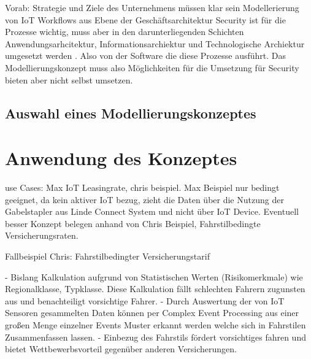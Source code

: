 \documentclass[a4paper, 12pt, twoside, headsepline=true]{scrartcl} %
\begin{document}
Vorab: Strategie und Ziele des Unternehmens müssen klar sein
Modellerierung von IoT Workflows aus Ebene der Geschäftsarchitektur
Security ist für die Prozesse wichtig, muss aber in den darunterliegenden Schichten Anwendungsarhcitektur, Informationsarchiektur und Technologische Archiektur umgesetzt werden \cite{enterpricearichitecture}. Also von der Software die diese Prozesse ausführt. Das Modellierungskonzept muss also Möglichkeiten für die Umsetzung für Security bieten aber nicht selbst umsetzen.


\subsection{Auswahl eines Modellierungskonzeptes}

\newpage

\section{Anwendung des Konzeptes}

use Cases: Max IoT Leasingrate, chris beispiel. Max Beispiel nur bedingt geeignet, da kein aktiver IoT bezug, zieht die Daten über die Nutzung der Gabelstapler aus Linde Connect System und nicht über IoT Device.
Eventuell besser Konzept belegen anhand von Chris Beispiel, Fahrstilbedingte Versicherungsraten. 

Fallbeispiel Chris: Fahrstilbedingter Versicherungstarif

- Bislang Kalkulation aufgrund von Statistischen Werten (Risikomerkmale) wie Regionalklasse, Typklasse. Diese Kalkulation fällt  schlechten Fahrern zugunsten aus und benachteiligt vorsichtige Fahrer.
- Durch Auswertung der von IoT Sensoren gesammelten Daten können per Complex Event Processing aus einer großen Menge einzelner Events Muster erkannt werden welche sich in Fahrstilen Zusammenfassen lassen.
- Einbezug des Fahrstils fördert vorsichtiges fahren und bietet Wettbewerbsvorteil gegenüber anderen Versicherungen.
\end{document}
